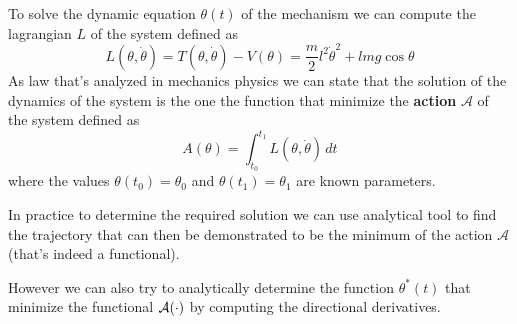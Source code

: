 	To solve the dynamic equation $\theta(t)$ of the mechanism we can compute the lagrangian $L $ of the system defined as
	\[ L (\theta,\dot\theta) = T(\theta,\dot\theta)-V(\theta) = \frac m 2 l^2\dot\theta^2 + lmg\cos\theta \]
	As law that's analyzed in mechanics physics we can state that the solution of the dynamics of the system is the one the function that minimize the \textbf{action} $\mathcal A$ of the system defined as
	\begin{equation} \label{eq:func:action}
		A(\theta) = \int_{t_0}^{t_1} L (\theta,\dot\theta)\, dt
	\end{equation}
	where the values $\theta(t_0)= \theta_0$ and $\theta(t_1)=\theta_1$ are known parameters.
	
	In practice to determine the required solution we can use analytical tool to find the trajectory that can then be demonstrated to be the minimum of the action $\mathcal A$ (that's indeed a functional).
	
	However we can also try to analytically determine the function $\theta^*(t)$ that minimize the functional $\mathcal{A}(\cdot)$ by computing the directional derivatives. \vspace{3mm}
	

